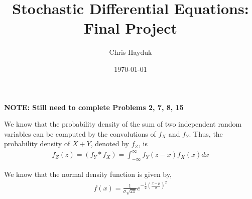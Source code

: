 \documentclass[12pt]{article}
\newenvironment{problem}[2][Problem]{\begin{trivlist}
\item[\hskip \labelsep {\bfseries #1}\hskip \labelsep {\bfseries #2.}]}{\end{trivlist}}
\begin{document}
\title{Stochastic Differential Equations: Final Project}

\author{Chris Hayduk}
\date{\today}

\maketitle

\textbf{NOTE: Still need to complete Problems 2, 7, 8, 15}

\begin{problem}{1}
\end{problem}

We know that the probability density of the sum of two independent random variables can be computed by the convolutions of $f_X$ and $f_Y$. Thus, the probability density of $X + Y$, denoted by $f_Z$, is
\begin{align}
f_Z(z) = (f_Y*f_X) = \int_{-\infty}^{\infty}  f_Y(z - x)f_X(x) dx
\end{align}

We know that the normal density function is given by,
\begin{align*}
f(x) = \frac{1}{\sigma\sqrt{2\pi}} e^{-\frac{1}{2}\left(\frac{x-\mu}{\sigma}\right)^2}
\end{align*}
\end{document}
